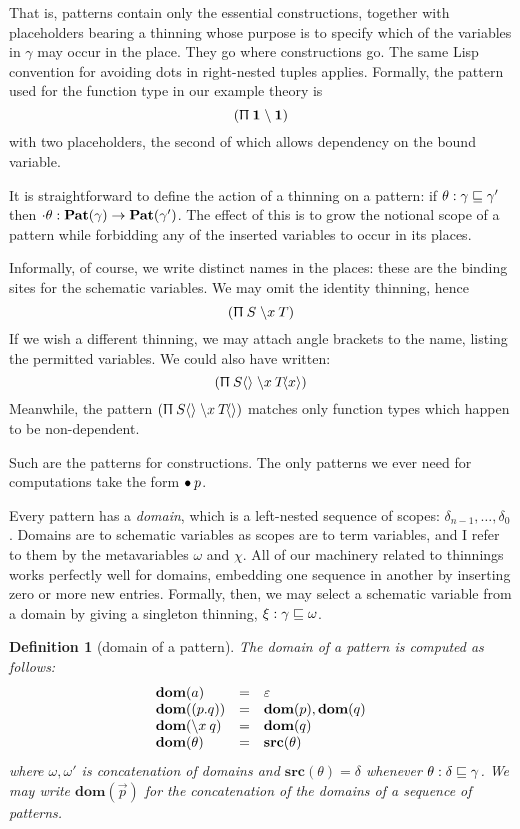 \documentclass{jfp1}
\newtheorem{definition}[theorem]{Definition}
\newcommand{\emp}{\varepsilon}
\begin{document}
\newcommand{\huth}[1]{\langle #1 \rangle}
That is, patterns contain only the essential constructions, together with
placeholders bearing a thinning whose purpose is to specify which of
the variables in $\gamma$ may occur in the place. They go where constructions
go. The same Lisp convention for avoiding dots in right-nested tuples applies.
Formally, the pattern used for the function type in our example theory is
\[
  (\Uppi\:\mathbf{1}\;\backslash \:{\mathbf{1}})
\]
with two placeholders, the second of which allows dependency on the bound variable.

It is straightforward to define the action of a thinning on a pattern: if
$\theta : \gamma\sqsubseteq\gamma'$ then $\cdot\theta : \textbf{Pat}(\gamma)\to\textbf{Pat}(\gamma')$.
The effect of this is to grow the notional scope of a pattern while
forbidding any of the inserted variables to occur in its places.

Informally, of course, we write distinct names in the places: these are the
binding sites for the schematic variables. We may omit the identity thinning,
hence
\[
  (\Uppi\:S\;\backslash x\:{T})
\]
If we wish a different thinning, we may attach angle brackets to the name,
listing the permitted variables. We could also have written:
\[
  \PI{S\huth{}}x{T\!\huth{x}}
\]
Meanwhile, the pattern $\PI{S\huth{}}x{T\!\huth{}}$ matches only function types which
happen to be non-dependent.

Such are the patterns for constructions. The only patterns we ever need for
computations take the form $\bullet\:p$.

Every pattern has a \emph{domain}, which is a left-nested sequence of
scopes: $\delta_{n-1},\ldots,\delta_0$. Domains are to schematic variables
as scopes are to term variables, and I refer to them by the
metavariables $\omega$ and $\chi$. All of our machinery related to thinnings works
perfectly well for domains, embedding one sequence in another by inserting
zero or more new entries. Formally, then, we may select a schematic variable
from a domain by giving a singleton thinning, $\xi : \gamma \sqsubseteq \omega$.

\newcommand{\dom}[1]{\textbf{dom}(#1)}
\newcommand{\src}[1]{\textbf{src}(#1)}
\begin{definition}[domain of a pattern]
  The \emph{domain} of a pattern is computed as follows:
  \[\begin{array}{lcl}
      \dom a & = & \emp \\
      \dom{(p.q)} & = & \dom{p},\dom{q} \\
      \dom{\la xq} & = & \dom{q} \\
      \dom{\theta} & = & \src{\theta}
    \end{array}\]
  where $\omega,\omega'$ is concatenation of domains and $\src{\theta} = \delta$ whenever
  $\theta : \delta\sqsubseteq\gamma$.
  We may write $\dom{\vec p}$ for the concatenation of the domains of a sequence
  of patterns.
\end{definition}
\end{document}

